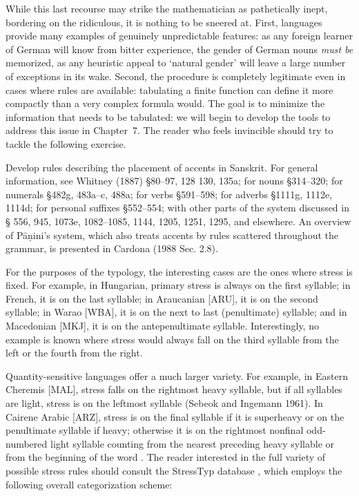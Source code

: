 While this last recourse may strike the mathematician as pathetically inept,
bordering on the ridiculous, it is nothing to be sneered at. First, languages
provide many examples of genuinely unpredictable features: as any
foreign learner of German will know from bitter experience, the gender of
German nouns {\it must be} memorized, as any heuristic appeal to `natural
gender' will leave a large number of exceptions in its wake. Second, the
procedure is completely legitimate even in cases where rules are available:
tabulating a finite function can define it more compactly than a very complex
formula would. The goal is to minimize the information that needs to be
tabulated: we will begin to develop the tools to address this issue in
Chapter~7. The reader who feels invincible should try to tackle the
following exercise.

\smallskip{} Develop rules describing the
placement of accents in Sanskrit. For general information, see Whitney (1887)
\S 80--97, 128 130, 135a; for nouns \S 314--320; for numerals \S 482g,
483a--c, 488a; for verbs \S 591--598; for adverbs \S 1111g, 1112e, 1114d; for
personal suffixes \S 552--554; with other parts of the system discussed in \S
556, 945, 1073e, 1082--1085, 1144, 1205, 1251, 1295, and elsewhere. An
overview of P\={a}\d{n}ini's system, which also treats accents by rules
scattered throughout the grammar, is presented in Cardona
(1988 Sec. 2.8).\nocite{Whitney:1887}\nocite{Cardona:1988}

\smallskip\noindent
For the purposes of the typology, the interesting cases are the ones where
stress is fixed. For example, in Hungarian, primary stress is always on the
first syllable; in French, it is on the last syllable; in Araucanian [ARU],
it is on the second syllable; in Warao [WBA], it is on the next to last
(penultimate) syllable; and in Macedonian [MKJ], it is on the antepenultimate
syllable. Interestingly, no example is known where stress would always fall on
the third syllable from the left or the fourth from the right. 
\nocite{Sebeok:1961}

Quantity-sensitive languages offer a much larger variety. For example, in
Eastern Cheremis [MAL], stress falls on the rightmost heavy syllable, but if
all syllables are light, stress is on the leftmost syllable (Sebeok and
Ingemann 1961).  In Cairene Arabic [ARZ], stress is on the final syllable if
it is superheavy or on the penultimate syllable if heavy; otherwise it is on
the rightmost nonfinal odd-numbered light syllable counting from the nearest
preceding heavy syllable or from the beginning of the word
\cite{McCarthy:1979}.  The reader interested in the full variety of possible
stress rules should consult the StressTyp database \cite{Goedemans:1996},
which employs the following overall categorization scheme:
 

